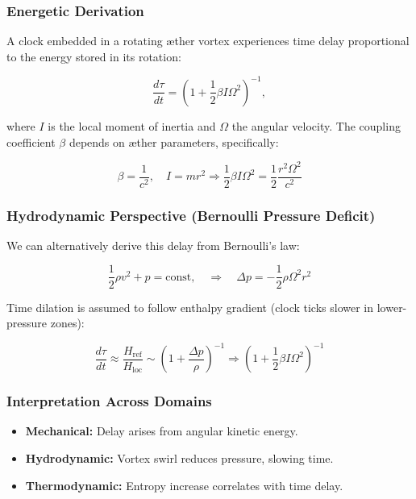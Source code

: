 \subsubsection{Energetic Derivation}
A clock embedded in a rotating æther vortex experiences time delay proportional to the energy stored in its rotation:

\begin{equation}
    \frac{d\tau}{dt} = \left(1 + \frac{1}{2} \beta I \Omega^2 \right)^{-1},
\end{equation}

where \( I \) is the local moment of inertia and \( \Omega \) the angular velocity. The coupling coefficient \( \beta \) depends on æther parameters, specifically:

\[
    \beta = \frac{1}{c^2}, \quad I = m r^2 \Rightarrow \frac{1}{2} \beta I \Omega^2 = \frac{1}{2} \frac{r^2 \Omega^2}{c^2}
\]

\subsubsection{Hydrodynamic Perspective (Bernoulli Pressure Deficit)}

We can alternatively derive this delay from Bernoulli’s law:

\[
    \frac{1}{2} \rho v^2 + p = \text{const}, \quad \Rightarrow \quad \Delta p = -\frac{1}{2} \rho \Omega^2 r^2
\]

Time dilation is assumed to follow enthalpy gradient (clock ticks slower in lower-pressure zones):

\[
    \frac{d\tau}{dt} \approx \frac{H_\text{ref}}{H_\text{loc}} \sim \left(1 + \frac{\Delta p}{\rho}\right)^{-1}
    \Rightarrow \left(1 + \frac{1}{2} \beta I \Omega^2\right)^{-1}
\]

\subsubsection{Interpretation Across Domains}

\begin{itemize}
    \item \textbf{Mechanical:} Delay arises from angular kinetic energy.
    \item \textbf{Hydrodynamic:} Vortex swirl reduces pressure, slowing time.
    \item \textbf{Thermodynamic:} Entropy increase correlates with time delay.
\end{itemize}


